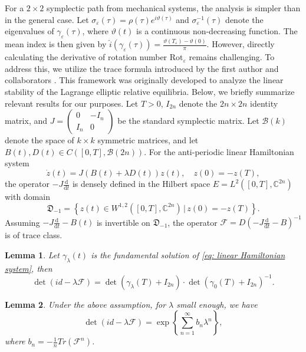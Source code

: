 \documentclass[11pt]{amsart}
\newcommand{\ep}{\varepsilon}
\newtheorem{lemma}{Lemma}[section]
\begin{document}
For a $2\times2$ symplectic path from mechanical systems, the analysis is simpler than in the general case. Let $\sigma_{\ep}(\tau)=\rho(\tau)e^{i\vartheta(\tau)}$ and $\sigma_{\ep}^{-1}(\tau)$ denote the eigenvalues of $\gamma_{\ep}(\tau)$, where $\vartheta(t)$ is a continuous non-decreasing function. The mean index is then given by  
	$
	\hat{i}(\gamma_{\ep}(\tau)) = \frac{\vartheta(T_{\ep}) - \vartheta(0)}{\pi}.  
	$  
However, directly calculating the derivative of rotation number $\text{Rot}_\ep$ remains challenging. To address this, we utilize the trace formula introduced by the first author and collaborators \cite{HOW15}. This framework was originally developed to analyze the linear stability of the Lagrange elliptic relative equilibria. Below, we briefly summarize relevant results for our purposes. Let $T>0$, $I_{2n}$ denote the $2n\times2n$ identity matrix, and  
$  
J = \begin{pmatrix} 0 & -I_n \\ I_n & 0 \end{pmatrix}  
$  
be the standard symplectic matrix. Let $\mathcal{B}(k)$ denote the space of $k\times k$ symmetric matrices, and let $B(t),D(t)\in C([0,T],\mathcal{B}(2n))$. For the anti-periodic linear Hamiltonian system  
\begin{equation}\label{eq: linear Hamiltonian system}
	\dot{z}(t)=J(B(t)+\lambda D(t))z(t),\quad z(0)=-z(T),
\end{equation}
the operator $-J\frac{\mathrm{d}}{\mathrm{d}t}$ is densely defined in the Hilbert space $E=L^{2}([0,T],\mathbb{C}^{2n})$ with domain 
\begin{equation*}
	\mathfrak{D}_{-1} = \left\{ z(t) \in W^{1,2}([0, T], \mathbb{C}^{2n}) \, \big| \, z(0) = -z(T) \right\}. 
\end{equation*}
Assuming $-J\frac{\mathrm{d}}{\mathrm{d}t}-B(t)$ is invertible on  $\mathfrak{D}_{-1}$, the operator $\mathcal{F} = D \left( -J\frac{\mathrm{d}}{\mathrm{d}t} - B \right)^{-1}$ is of trace class.
\begin{lemma}\label{lemma: trace formular1}
	\cite[Theorem 3.3]{HOW15} Let $\gamma_{\lambda}(t)$ is the fundamental solution of \eqref{eq: linear Hamiltonian system}, then
	\begin{equation*}
		\det(id-\lambda\mathcal{F})= \det(\gamma_{\lambda}(T)+I_{2n})\cdot\det(\gamma_{0}(T)+I_{2n})^{-1}.
	\end{equation*}
\end{lemma}
\begin{lemma}\label{lemma;det}
	\cite[Theorem 2.2]{HOW15} Under the above assumption, for $\lambda$ small enough, we have
	\begin{equation*}
		\det(id-\lambda\mathcal{F})=\exp\left\{\sum_{n=1}^{\infty}b_n\lambda^n\right\},
	\end{equation*}
	where $b_n=-\frac{1}{n}Tr(\mathcal{F}^n)$.
\end{lemma}
\end{document}
